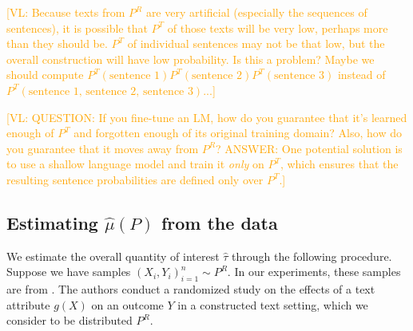 \documentclass{article}
\newcommand{\vl}[1]{\textcolor{orange}{[VL: #1]}}
\begin{document}


\vl{Because texts from $P^R$ are very artificial (especially the sequences of sentences), it is possible that $P^T$ of those texts will be very low, perhaps more than they should be. $P^T$ of individual sentences may not be that low, but the overall construction will have low probability. Is this a problem? Maybe we should compute $P^T(\text{sentence 1})P^T(\text{sentence 2})P^T(\text{sentence 3})$ instead of $P^T(\text{sentence 1, sentence 2, sentence 3})$...}

\vl{QUESTION: If you fine-tune an LM, how do you guarantee that it's learned enough of $P^T$ and forgotten enough of its original training domain? Also, how do you guarantee that it moves away from $P^R$?
ANSWER: One potential solution is to use a shallow language model and train it \textit{only} on $P^T$, which ensures that the resulting sentence probabilities are defined only over $P^T$.}

\subsection{Estimating $\hat{\mu}(P)$ from the data}

We estimate the overall quantity of interest $\hat{\tau}$ through the following procedure. Suppose we have samples $(X_i,Y_i)_{i=1}^n \sim P^R$. In our experiments, these samples are from \cite{fong2021causal}. The authors conduct a randomized study on the effects of a text attribute $g(X)$ on an outcome $Y$ in a constructed text setting, which we consider to be distributed $P^R$.
\end{document}
